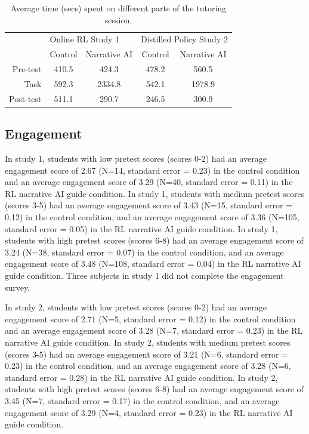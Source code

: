 \documentclass[sn-mathphys,Numbered]{sn-jnl}%
\theoremstyle{thmstyleone}%
\theoremstyle{thmstyletwo}%
\theoremstyle{thmstylethree}%
\begin{document}
\begin{appendices}
\begin{table}[ht]
\centering
\caption{Average time (secs) spent on different parts of the tutoring session.}
\vspace{1mm}
\begin{tabular}{@{}r|cc|cc@{}}
\toprule
\multicolumn{1}{l}{} & \multicolumn{2}{l}{Online RL Study 1} & \multicolumn{2}{l}{Distilled Policy Study 2} \\ 
\multicolumn{1}{l}{} & Control         & Narrative AI        & Control            & Narrative AI            \\ \midrule
Pre-test             & 410.5           & 424.3               & 478.2              & 560.5                   \\
Task                 & 592.3           & 2334.8              & 542.1              & 1978.9                  \\
Post-test            & 511.1           & 290.7               & 246.5              &  300.9                  \\ \bottomrule
\end{tabular}
\label{rlbot:tab:time-spent}
\end{table}

\subsection*{Engagement}
In study 1, students with low pretest scores (scores 0-2) had an average engagement score of 2.67 (N=14, standard error = 0.23) in the control condition and an average engagement score of 3.29 (N=40, standard error = 0.11) in the RL narrative AI guide condition. In study 1, students with medium pretest scores (scores 3-5) had an average engagement score of 3.43 (N=15, standard error = 0.12) in the control condition, and an average engagement score of 3.36 (N=105, standard error = 0.05) in the RL narrative AI guide condition. In study 1, students with high pretest scores (scores 6-8) had an average engagement score of 3.24 (N=38, standard error = 0.07) in the control condition, and an average engagement score of 3.48 (N=108, standard error = 0.04) in the RL narrative AI guide condition. Three subjects in study 1 did not complete the engagement survey. 

In study 2, students with low pretest scores (scores 0-2) had an average engagement score of 2.71 (N=5, standard error = 0.12) in the control condition and an average engagement score of 3.28 (N=7, standard error = 0.23) in the RL narrative AI guide condition. In study 2, students with medium pretest scores (scores 3-5) had an average engagement score of 3.21 (N=6, standard error = 0.23) in the control condition, and an average engagement score of 3.28 (N=6, standard error = 0.28) in the RL narrative AI guide condition. In study 2, students with high pretest scores (scores 6-8) had an average engagement score of 3.45 (N=7, standard error = 0.17) in the control condition, and an average engagement score of 3.29 (N=4, standard error = 0.23) in the RL narrative AI guide condition.



\end{appendices}
\end{document}
